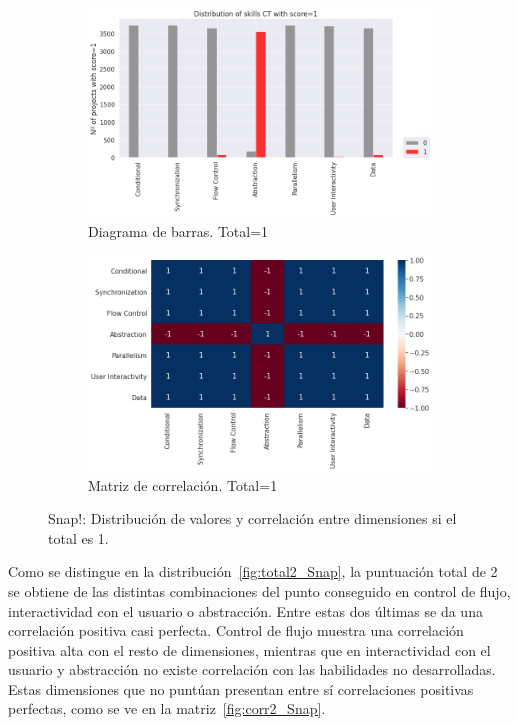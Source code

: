 \documentclass[a4paper, 12pt]{book}
\begin{document}
\begin{figure}[H]
    \centering
    \begin{subfigure}[h]{.49\textwidth} 
        \includegraphics[width=\textwidth]{img/distribucion_1_Snap}
        \caption{Diagrama de barras. Total=1}
        \label{fig:total1_Snap}
    \end{subfigure}       
    \begin{subfigure}[h]{.49\textwidth} 
        \includegraphics[width=\textwidth]{img/corr_1_Snap}
        \caption{Matriz de correlación. Total=1}
        \label{fig:corr1_Snap}
    \end{subfigure}
     \caption{Snap!: Distribución de valores y correlación entre dimensiones si el total es 1.}
\end{figure}

Como se distingue en la distribución~\ref{fig:total2_Snap}, la puntuación total de 2 se obtiene de las distintas combinaciones del punto conseguido en control de flujo, interactividad con el usuario o abstracción. Entre estas dos últimas se da una correlación positiva casi perfecta. Control de flujo muestra una correlación positiva alta con el resto de dimensiones, mientras que en interactividad con el usuario y abstracción no existe correlación con las habilidades no desarrolladas. Estas dimensiones que no puntúan presentan entre sí correlaciones positivas perfectas, como se ve en la matriz~\ref{fig:corr2_Snap}.
\end{document}
